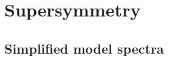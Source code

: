 \chapter{Supersymmetry \label{chap:supersymmetry}}



\section{Simplified model spectra \label{sec:sms}}

